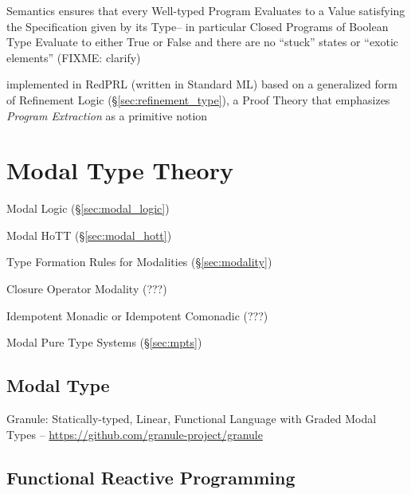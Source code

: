 Semantics ensures that every Well-typed Program Evaluates to a Value satisfying
the Specification given by its Type-- in particular Closed Programs of Boolean
Type Evaluate to either True or False and there are no ``stuck'' states or
``exotic elements'' (FIXME: clarify)

implemented in RedPRL (written in Standard ML) based on a generalized form of
Refinement Logic (\S\ref{sec:refinement_type}), a Proof Theory that emphasizes
\emph{Program Extraction} as a primitive notion




\section{Modal Type Theory}\label{sec:modal_type_theory}

Modal Logic (\S\ref{sec:modal_logic})

Modal HoTT (\S\ref{sec:modal_hott})

Type Formation Rules for Modalities (\S\ref{sec:modality})

Closure Operator Modality (???)

Idempotent Monadic or Idempotent Comonadic (???)

Modal Pure Type Systems (\S\ref{sec:mpts})



\subsection{Modal Type}\label{sec:modal_type}

Granule: Statically-typed, Linear, Functional Language with Graded Modal
Types -- \url{https://github.com/granule-project/granule}



\subsection{Functional Reactive Programming}\label{sec:frp}

